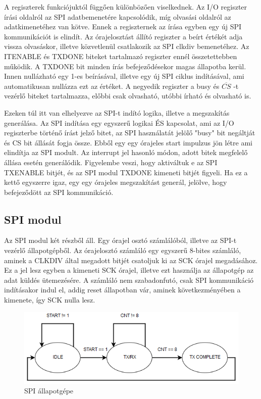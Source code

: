 \documentclass[a4paper,11pt]{article}
\begin{document}
A regiszterek funkciójuktól függően különbözően viselkednek. Az I/O regiszter írási oldalról az SPI adatbemenetére kapcsolódik, míg olvasási oldalról az adatkimenetéhez van kötve. Ennek a regiszternek az írása egyben egy új SPI kommunikációt is elindít. Az órajelosztást állító regiszter a beírt értékét adja vissza olvasáskor, illetve közvetlenül csatlakozik az SPI clkdiv bemenetéhez. Az ITENABLE és TXDONE biteket tartalmazó regiszter ennél összetettebben működik. A TXDONE bit minden írás befejeződésekor magas állapotba kerül. Innen nullázható egy 1-es beírásával, illetve egy új SPI ciklus indításával, ami automatikusan nullázza ezt az értéket. A negyedik regiszter a busy és $\overline{CS}$ -t vezérlő biteket tartalmazza, előbbi csak olvasható, utóbbi írható és olvasható is.

Ezeken túl itt van elhelyezve az SPI-t indító logika, illetve a megszakítás generálása. Az SPI indítása egy egyszerű logikai ÉS kapcsolat, ami az I/O regiszterbe történő írást jelző bitet, az SPI használatát jelölő "busy" bit negáltját és CS bit állását fogja össze. Ebből egy egy órajeles start impulzus jön létre ami elindítja az SPI modult. Az interrupt jel hasonló módon, adott bitek megfelelő állása esetén generálódik. Figyelembe veszi, hogy aktiváltuk e az SPI TX\textunderscore ENABLE bitjét, és az SPI modul TXDONE kimeneti bitjét figyeli. Ha ez a kettő egyszerre igaz, egy egy órajeles megszakítást generál, jelölve, hogy befejeződött az SPI kommunikáció.

\subsection{SPI modul}

Az SPI modul két részből áll. Egy órajel osztó számlálóból, illetve az SPI-t vezérlő állapotgépből. Az órajelosztó számláló egy egyszerű 8-bites számláló, aminek a CLKDIV által megadott bitjét csatoljuk ki az SCK órajel megadásához. Ez a jel lesz egyben a kimeneti SCK órajel, illetve ezt használja az állapotgép az adat küldés ütemezésére. A számláló nem szabadonfutó, csak SPI kommunikáció indításakor indul el, addig reset állapotban vár, aminek következményében a kimenete, így SCK nulla lesz.

\begin{figure}[H]
	\begin{center}
	\includegraphics[scale=0.6]{spi_statemachine.png}
	\caption{SPI állapotgépe}
	\label{fig:spistatemchn}
	\end{center}
\end{figure}
\end{document}
